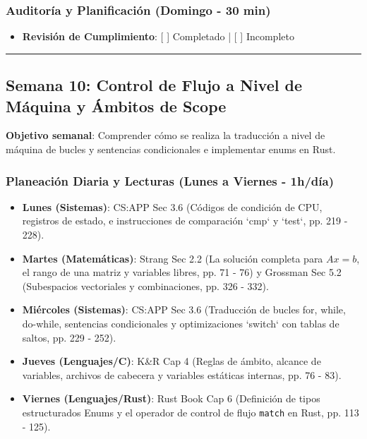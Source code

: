 \documentclass[11pt, a4paper]{article}
\begin{document}
\subsubsection{Auditoría y Planificación (Domingo - 30 min)}
\begin{itemize}
    \item \textbf{Revisión de Cumplimiento}: [ ] Completado | [ ] Incompleto
\end{itemize}

\noindent\rule{\textwidth}{0.4pt}

\subsection{Semana 10: Control de Flujo a Nivel de Máquina y Ámbitos de Scope}
\textbf{Objetivo semanal}: Comprender cómo se realiza la traducción a nivel de máquina de bucles y sentencias condicionales e implementar enums en Rust.

\subsubsection{Planeación Diaria y Lecturas (Lunes a Viernes - 1h/día)}
\begin{itemize}
    \item \textbf{Lunes (Sistemas)}: CS:APP Sec 3.6 (Códigos de condición de CPU, registros de estado, e instrucciones de comparación `cmp` y `test`, pp. 219 - 228).
    \item \textbf{Martes (Matemáticas)}: Strang Sec 2.2 (La solución completa para $Ax = b$, el rango de una matriz y variables libres, pp. 71 - 76) y Grossman Sec 5.2 (Subespacios vectoriales y combinaciones, pp. 326 - 332).
    \item \textbf{Miércoles (Sistemas)}: CS:APP Sec 3.6 (Traducción de bucles for, while, do-while, sentencias condicionales y optimizaciones `switch` con tablas de saltos, pp. 229 - 252).
    \item \textbf{Jueves (Lenguajes/C)}: K\&R Cap 4 (Reglas de ámbito, alcance de variables, archivos de cabecera y variables estáticas internas, pp. 76 - 83).
    \item \textbf{Viernes (Lenguajes/Rust)}: Rust Book Cap 6 (Definición de tipos estructurados Enums y el operador de control de flujo \texttt{match} en Rust, pp. 113 - 125).
\end{itemize}
\end{document}

